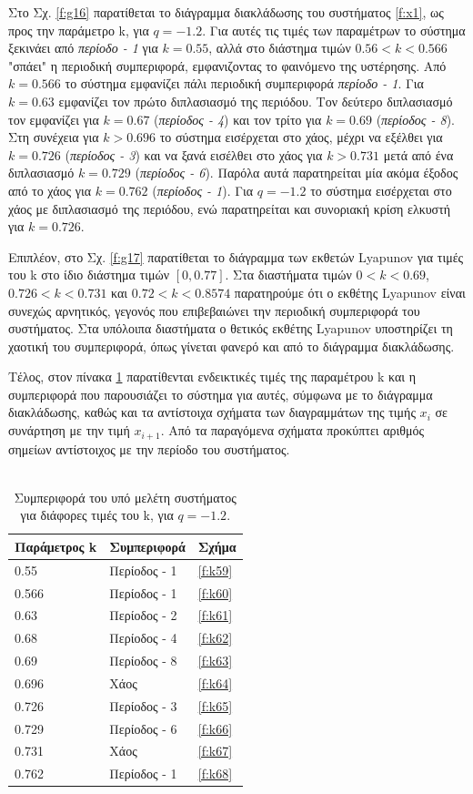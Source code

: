 Στο Σχ. \ref{f:g16} παρατίθεται το διάγραμμα διακλάδωσης του συστήματος \ref{f:x1}, ως προς την παράμετρο k, για $q =- 1.2$. Για αυτές τις τιμές των παραμέτρων το σύστημα ξεκινάει από \emph{περίοδο - 1} για $k = 0.55$, αλλά στο διάστημα τιμών $0.56<k<0.566$ "σπάει" η περιοδική συμπεριφορά, εμφανιζοντας το φαινόμενο της υστέρησης. Από $k=0.566$ το σύστημα εμφανίζει πάλι περιοδική συμπεριφορά \emph{περίοδο - 1}. Για  $k = 0.63$ εμφανίζει τον πρώτο διπλασιασμό της περιόδου. Τον δεύτερο διπλασιασμό τον εμφανίζει για $k=0.67$ (\emph{περίοδος - 4}) και τον τρίτο για $k=0.69$ (\emph{περίοδος -   8}). Στη συνέχεια για $k>0.696$ το σύστημα εισέρχεται στο χάος, μέχρι να εξέλθει για $k=0.726$  (\emph{περίοδος - 3}) και να ξανά εισέλθει στο χάος για $k>0.731$ μετά από ένα διπλασιασμό $k=0.729$ (\emph{περίοδος - 6}). Παρόλα αυτά παρατηρείται μία ακόμα έξοδος από το χάος για $k=0.762$ (\emph{περίοδος -   1}). Για $q=-1.2$ το σύστημα εισέρχεται στο χάος με διπλασιασμό της περιόδου, ενώ παρατηρείται και συνοριακή κρίση ελκυστή για $k=0.726$.

Επιπλέον, στο Σχ. \ref{f:g17} παρατίθεται το διάγραμμα των εκθετών Lyapunov για τιμές του k στο ίδιο διάστημα τιμών $[0, 0.77]$. Στα διαστήματα τιμών $0<k<0.69$, $0.726<k<0.731$ και $0.72<k<0.8574$ παρατηρούμε ότι ο εκθέτης Lyapunov είναι συνεχώς αρνητικός, γεγονός που επιβεβαιώνει την περιοδική συμπεριφορά του συστήματος. Στα υπόλοιπα διαστήματα ο θετικός εκθέτης Lyapunov υποστηρίζει τη χαοτική του συμπεριφορά, όπως γίνεται φανερό και από το διάγραμμα διακλάδωσης.

Τέλος, στον πίνακα \ref{tab:abc5} παρατίθενται ενδεικτικές τιμές της παραμέτρου k και η συμπεριφορά που παρουσιάζει το σύστημα για αυτές, σύμφωνα με το διάγραμμα διακλάδωσης, καθώς και τα αντίστοιχα σχήματα των διαγραμμάτων της τιμής \(x_i\) σε συνάρτηση με την τιμή \(x_{i+1}\). Από τα παραγόμενα σχήματα προκύπτει αριθμός σημείων αντίστοιχος με την περίοδο του συστήματος.\\\\

\begin{table}[ht]
	\centering
	\caption{ Συμπεριφορά του υπό μελέτη συστήματος για διάφορες τιμές του k, για $q=-1.2$.}
	\label{tab:abc5}
	\begin{tabular}{l | l | l}
		Παράμετρος k & Συμπεριφορά & Σχήμα\\
		\hline
		0.55 &  Περίοδος -  1 & \ref{f:k59}\\
		0.566 &  Περίοδος -  1 & \ref{f:k60}\\
		0.63& Περίοδος -  2 & \ref{f:k61}\\
		0.68& Περίοδος -  4 & \ref{f:k62}\\
		0.69 &  Περίοδος -  8 & \ref{f:k63}\\
		0.696& Χάος & \ref{f:k64}\\
		0.726& Περίοδος -  3 & \ref{f:k65}\\
		0.729& Περίοδος -  6 & \ref{f:k66}\\
		0.731& Χάος & \ref{f:k67}\\
		0.762 &  Περίοδος -  1 & \ref{f:k68}\\
	\end{tabular}
\end{table}

